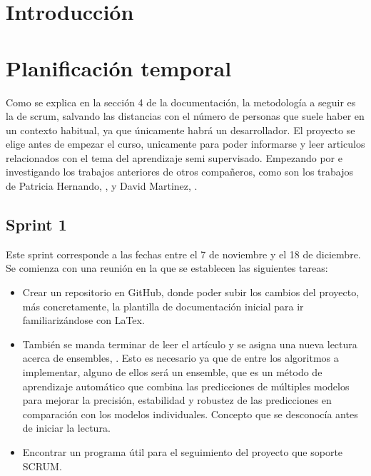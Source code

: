
\section{Introducción}

\section{Planificación temporal}
Como se explica en la sección 4 de la documentación, la metodología a seguir es la de scrum, salvando las distancias con el número de personas que suele haber en un contexto habitual, ya que únicamente habrá un desarrollador.
El proyecto se elige antes de empezar el curso, unicamente para poder informarse y leer articulos relacionados con el tema del aprendizaje semi supervisado. Empezando por \cite{Engelen:semi-supervised} e investigando los trabajos anteriores de otros compañeros, como son los trabajos de Patricia Hernando, \cite{TFG:Patricia} , y David Martinez, \cite{TFG:David}.
\subsection{Sprint 1}
Este sprint corresponde a las fechas entre el 7 de noviembre y el 18 de diciembre. Se comienza con una reunión en la que se establecen las siguientes tareas:\\
\begin{itemize}
	\item Crear un repositorio en GitHub, \cite{Repo:Github} donde poder subir los cambios del proyecto, más concretamente, la plantilla de documentación inicial para ir familiarizándose con LaTex.
	\item También se manda terminar de leer el artículo \cite{Engelen:semi-supervised} y se asigna una nueva lectura acerca de ensembles, \cite{ensembles}. Esto es necesario ya que de entre los algoritmos a implementar, alguno de ellos será un ensemble, que es un método de aprendizaje automático que combina las predicciones de múltiples modelos para mejorar la precisión, estabilidad y robustez de las predicciones en comparación con los modelos individuales. Concepto que se desconocía antes de iniciar la lectura.
	\item Encontrar un programa útil para el seguimiento del proyecto que soporte SCRUM.
\end{itemize}


